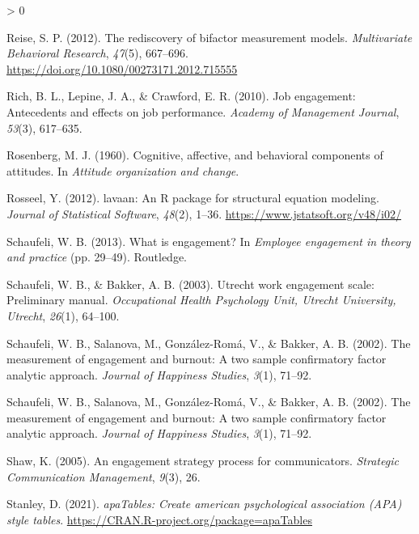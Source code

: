 \documentclass[
  english,
  man]{apa7}
\newlength{\cslhangindent}
\newenvironment{CSLReferences}[2] %
 {%
  \setlength{\parindent}{0pt}
  \ifodd #1 \everypar{\setlength{\hangindent}{\cslhangindent}}\ignorespaces\fi
  \ifnum #2 > 0
  \setlength{\parskip}{#2\baselineskip}
  \fi
 }%
 {}
\begin{document}
\begin{CSLReferences}{1}{0}
\leavevmode\hypertarget{ref-reise_rediscovery_2012}{}%
Reise, S. P. (2012). The rediscovery of bifactor measurement models. \emph{Multivariate Behavioral Research}, \emph{47}(5), 667--696. \url{https://doi.org/10.1080/00273171.2012.715555}

\leavevmode\hypertarget{ref-rich2010job}{}%
Rich, B. L., Lepine, J. A., \& Crawford, E. R. (2010). Job engagement: Antecedents and effects on job performance. \emph{Academy of Management Journal}, \emph{53}(3), 617--635.

\leavevmode\hypertarget{ref-rosenberg_cognitive_1960}{}%
Rosenberg, M. J. (1960). Cognitive, affective, and behavioral components of attitudes. In \emph{Attitude organization and change}.

\leavevmode\hypertarget{ref-R-lavaan}{}%
Rosseel, Y. (2012). {lavaan}: An {R} package for structural equation modeling. \emph{Journal of Statistical Software}, \emph{48}(2), 1--36. \url{https://www.jstatsoft.org/v48/i02/}

\leavevmode\hypertarget{ref-schaufeli2013engagement}{}%
Schaufeli, W. B. (2013). What is engagement? In \emph{Employee engagement in theory and practice} (pp. 29--49). Routledge.

\leavevmode\hypertarget{ref-schaufeli2003utrecht}{}%
Schaufeli, W. B., \& Bakker, A. B. (2003). Utrecht work engagement scale: Preliminary manual. \emph{Occupational Health Psychology Unit, Utrecht University, Utrecht}, \emph{26}(1), 64--100.

\leavevmode\hypertarget{ref-schaufeli_measurement_2002}{}%
Schaufeli, W. B., Salanova, M., González-Romá, V., \& Bakker, A. B. (2002). The measurement of engagement and burnout: A two sample confirmatory factor analytic approach. \emph{Journal of Happiness Studies}, \emph{3}(1), 71--92.

\leavevmode\hypertarget{ref-schaufeli_measurement_2002}{}%
Schaufeli, W. B., Salanova, M., González-Romá, V., \& Bakker, A. B. (2002). The measurement of engagement and burnout: A two sample confirmatory factor analytic approach. \emph{Journal of Happiness Studies}, \emph{3}(1), 71--92.

\leavevmode\hypertarget{ref-shaw2005engagement}{}%
Shaw, K. (2005). An engagement strategy process for communicators. \emph{Strategic Communication Management}, \emph{9}(3), 26.

\leavevmode\hypertarget{ref-R-apaTables}{}%
Stanley, D. (2021). \emph{apaTables: Create american psychological association (APA) style tables}. \url{https://CRAN.R-project.org/package=apaTables}


\end{CSLReferences}
\end{document}
